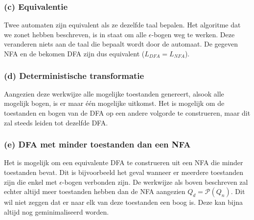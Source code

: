 \subsubsection*{(c) Equivalentie}
Twee automaten zijn equivalent als ze dezelfde taal bepalen. Het algoritme dat we zonet hebben beschreven, is in staat om alle $\epsilon$-bogen weg te werken. Deze veranderen niets aan de taal die bepaalt wordt door de automaat. De gegeven NFA en de bekomen DFA zijn dus equivalent ($L_{DFA} = L_{NFA}$).

\subsubsection*{(d) Deterministische transformatie}
Aangezien deze werkwijze alle mogelijke toestanden genereert, alsook alle mogelijk bogen, is er maar \'e\'en mogelijke uitkomst. Het is mogelijk om de toestanden en bogen van de DFA op een andere volgorde te construeren, maar dit zal steeds leiden tot dezelfde DFA.

\subsubsection*{(e) DFA met minder toestanden dan een NFA}

Het is mogelijk om een equivalente DFA te construeren uit een NFA die minder toestanden bevat. Dit is bijvoorbeeld het geval wanneer er meerdere toestanden zijn die enkel met $\epsilon$-bogen verbonden zijn. De werkwijze als boven beschreven zal echter altijd meer toestanden hebben dan de NFA aangezien $Q_d = \mathcal{P}(Q_n)$. Dit wil niet zeggen dat er naar elk van deze toestanden een boog is. Deze kan bijna altijd nog geminimaliseerd worden.
